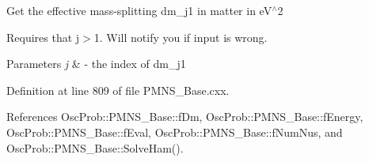 Get the effective mass-\/splitting dm\+\_\+j1 in matter in e\+V$^\wedge$2

Requires that j$>$1. Will notify you if input is wrong.


\begin{DoxyParams}{Parameters}
{\em j} & -\/ the index of dm\+\_\+j1 \\
\hline
\end{DoxyParams}


Definition at line 809 of file P\+M\+N\+S\+\_\+\+Base.\+cxx.



References Osc\+Prob\+::\+P\+M\+N\+S\+\_\+\+Base\+::f\+Dm, Osc\+Prob\+::\+P\+M\+N\+S\+\_\+\+Base\+::f\+Energy, Osc\+Prob\+::\+P\+M\+N\+S\+\_\+\+Base\+::f\+Eval, Osc\+Prob\+::\+P\+M\+N\+S\+\_\+\+Base\+::f\+Num\+Nus, and Osc\+Prob\+::\+P\+M\+N\+S\+\_\+\+Base\+::\+Solve\+Ham().



